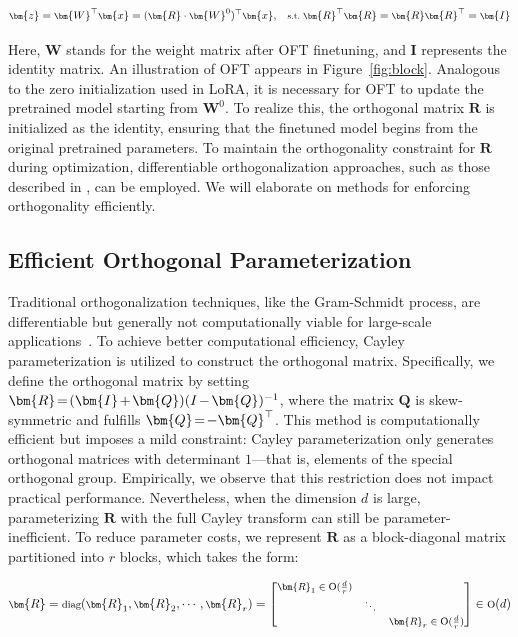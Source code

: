 \begin{equation}\label{eq:oft_general}
    \footnotesize
    \bm{z}=\bm{W}^\top\bm{x}=(\bm{R}\cdot\bm{W}^0)^\top\bm{x},~~~\text{s.t.}~\bm{R}^\top\bm{R}=\bm{R}\bm{R}^\top=\bm{I}
\end{equation}

Here, $\bm{W}$ stands for the weight matrix after OFT finetuning, and $\bm{I}$ represents the identity matrix. An illustration of OFT appears in Figure~\ref{fig:block}. Analogous to the zero initialization used in LoRA, it is necessary for OFT to update the pretrained model starting from $\bm{W}^0$. To realize this, the orthogonal matrix $\bm{R}$ is initialized as the identity, ensuring that the finetuned model begins from the original pretrained parameters. To maintain the orthogonality constraint for $\bm{R}$ during optimization, differentiable orthogonalization approaches, such as those described in \cite{liu2021orthogonal,lezcano2019cheap}, can be employed. We will elaborate on methods for enforcing orthogonality efficiently.

\subsection{Efficient Orthogonal Parameterization}\label{sect:eff_ortho}

Traditional orthogonalization techniques, like the Gram-Schmidt process, are differentiable but generally not computationally viable for large-scale applications~\cite{liu2021orthogonal}. To achieve better computational efficiency, Cayley parameterization is utilized to construct the orthogonal matrix. Specifically, we define the orthogonal matrix by setting $\thickmuskip=2mu \medmuskip=2mu \bm{R}=(\bm{I}+\bm{Q})(I-\bm{Q})^{-1}$, where the matrix $\bm{Q}$ is skew-symmetric and fulfills $\thickmuskip=2mu \medmuskip=2mu \bm{Q}=-\bm{Q}^\top$. This method is computationally efficient but imposes a mild constraint: Cayley parameterization only generates orthogonal matrices with determinant $1$—that is, elements of the special orthogonal group. Empirically, we observe that this restriction does not impact practical performance. Nevertheless, when the dimension $d$ is large, parameterizing $\bm{R}$ with the full Cayley transform can still be parameter-inefficient. To reduce parameter costs, we represent $\bm{R}$ as a block-diagonal matrix partitioned into $r$ blocks, which takes the form:

\begin{equation}
    \footnotesize
    \bm{R}=\text{diag}(\bm{R}_1,\bm{R}_2,\cdots,\bm{R}_r)=\begin{bmatrix}
    \bm{R}_1\in \text{O}(\frac{d}{r}) &  &\\
    &\ddots & \\
    & & \bm{R}_r\in \text{O}(\frac{d}{r})
    \end{bmatrix}\in \text{O}(d)
\end{equation}

